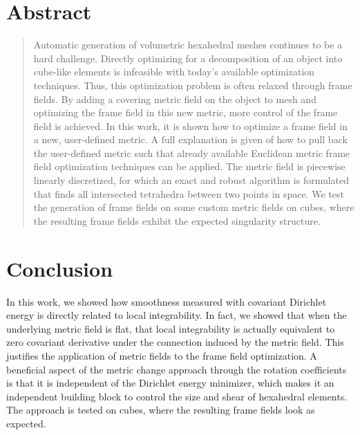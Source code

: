 \documentclass[a4paper,twoside,openright,11pt]{report}
\begin{document}
\chapter*{\centering Abstract}
\begin{quote}\noindent
  Automatic generation of volumetric hexahedral meshes continues
  to be a hard challenge. Directly optimizing for a decomposition 
  of an object into cube-like elements is infeasible with today's
  available optimization techniques. Thus, this optimization problem is
  often relaxed through frame fields. By adding a covering
  metric field on the object to mesh and optimizing the frame field
  in this new metric, more control of the frame field is achieved.
  In this work, it is shown how to optimize a frame field in a
  new, user-defined metric. A full explanation is given of how to pull back
  the user-defined metric such that already available Euclidean metric frame field
  optimization techniques can be applied. The metric field is
  piecewise linearly discretized, for which an exact and robust algorithm
  is formulated that finds all intersected tetrahedra between two points in space.
  We test the generation of frame fields on some custom metric fields
  on cubes, where the resulting frame fields exhibit the expected singularity structure.

\end{quote}

\cleardoublepage


\tableofcontents


\cleardoublepage









\chapter{Conclusion}
\label{ch:conclusion}
In this work, we showed how smoothness measured with covariant Dirichlet
energy is directly related to local integrability. In fact, we showed
that when the underlying metric field is flat, that local integrability
is actually equivalent to zero covariant derivative under the connection
induced by the metric field. This justifies
the application of metric fields to the frame field optimization.
A beneficial aspect of the metric change approach through the rotation coefficients is that it
is independent of the Dirichlet energy minimizer, which makes it an
independent building block to control the size and shear of hexahedral elements. 
The approach is tested on cubes, where the resulting frame fields
look as expected.
\end{document}
